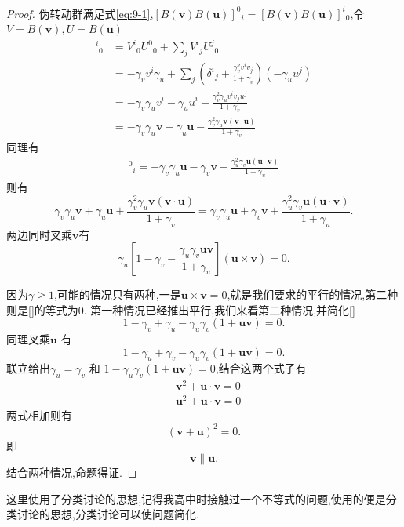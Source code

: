 \documentclass[../main.tex]{subfiles}
\begin{document}
\begin{proof}
	伪转动群满足式\ref{eq:9-1},$[B(\bm{v})B(\bm{u} )]^{0}{}_{i} = [B(\bm{v})B(\bm{u} )]^{i}{}_{0}$,令$V = B(\bm{v}), U = B(\bm{u} ) $
	\begin{align*}
		[VU]^{i}{}_{0} & =V^{i}{}_{0}U^{0}{}_{0} + \sum_j V^{i}{}_{j} U^{j}{}_{0}                                                              \\
		               & = -\gamma_v v^i \gamma_u + \sum_j (\delta^{i}{}_{j} + \frac{\gamma_v^2 v^iv_j}{1 +\gamma_v})(-\gamma_u u^j)           \\
		               & = -\gamma_v \gamma_u v^i - \gamma_u u^i - \frac{\gamma_v^2 \gamma_u v^iv_j u^j}{1+\gamma_v}                           \\
		               & = -\gamma_v \gamma_u \bm{v}  - \gamma_u \bm{u}  - \frac{\gamma_v^2 \gamma_u \bm{v} (\bm{v} \cdot\bm{u} )}{1+\gamma_v}
	\end{align*}
	同理有
	\begin{align*}
		[VU]^{0}{}_{i} = -\gamma_v \gamma_u \bm{u} -  \gamma_v \bm{v} -  \frac{\gamma_u^2 \gamma_v \bm{u}(\bm{u}\cdot \bm{v}  ) }{1+\gamma_u}
	\end{align*}
	则有\[
		\gamma_v \gamma_u \bm{v}  + \gamma_u \bm{u}  + \frac{\gamma_v^2 \gamma_u \bm{v} (\bm{v} \cdot\bm{u} )}{1+\gamma_v} =  \gamma_v \gamma_u \bm{u} +  \gamma_v \bm{v} +  \frac{\gamma_u^2 \gamma_v \bm{u}(\bm{u}\cdot \bm{v}  ) }{1+\gamma_u}
		.\]
	两边同时叉乘$\bm{v} $有\[
		\gamma_u[1-\gamma_v - \frac{\gamma_u \gamma_v \bm{u}\bm{v}  }{1 + \gamma_u}](\bm{u}\times \bm{v}) = 0
		.\]

	因为$\gamma \ge 1$,可能的情况只有两种,一是$\bm{u}\times \bm{v} = 0  $,就是我们要求的平行的情况,第二种则是[]的等式为0.
	第一种情况已经推出平行,我们来看第二种情况,并简化[]
	\[
		1 - \gamma_v + \gamma_u -\gamma_u\gamma_v(1+\bm{u}\bm{v}) = 0
		.\]
	同理叉乘$\bm{u}$ 有\[
		1 - \gamma_u + \gamma_v - \gamma_u\gamma_v (1 + \bm{u}\bm{v}  ) =0
		.\]
	联立给出$\gamma_u = \gamma_v$ 和  $1 - \gamma_u\gamma_v(1 + \bm{u}\bm{v}) = 0 $,结合这两个式子有
	\begin{align*}
		 & \bm{v}^2 + \bm{u}\cdot\bm{v} = 0   \\
		 & \bm{u}^2 +  \bm{u}\cdot \bm{v} = 0
	\end{align*}
	两式相加则有\[
		(\bm{v} + \bm{u}  ) ^2 = 0
		.\]
	即\[
		\bm{v}\parallel \bm{u}
		.\]
	结合两种情况,命题得证.
\end{proof}
\begin{note}
	这里使用了分类讨论的思想,记得我高中时接触过一个不等式的问题,使用的便是分类讨论的思想,分类讨论可以使问题简化.
\end{note}
\end{document}
